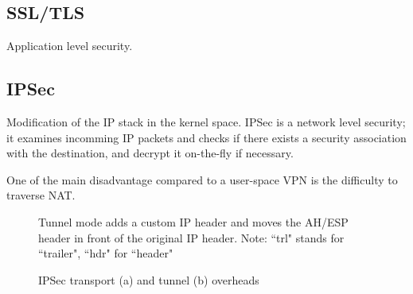 \subsection{SSL/TLS}
Application level security.














\subsection{IPSec}
Modification of the IP stack in the kernel space.
IPSec is a network level security; it examines incomming IP packets and checks if there exists a security association with the destination, and decrypt it on-the-fly if necessary.

One of the main disadvantage compared to a user-space VPN is the difficulty to traverse NAT.


\begin{figure}[ht]
\center
{}
\caption{IPSec transport (a) and tunnel (b) overheads}{Tunnel mode adds a custom IP header and moves the AH/ESP header in front of the original IP header. Note: ``trl" stands for ``trailer", ``hdr" for ``header"}
\label{fig:ipsec-transport-tunnel}
\end{figure}